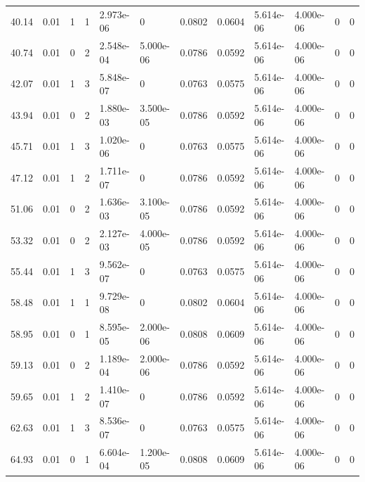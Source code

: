 \documentclass[preview]{standalone}
\begin{document}
{{\begin{tabular}{L{1.2cm}C{1.2cm} C{0.3cm}C{0.5cm} C{1.4cm}C{1.4cm} C{1.4cm}C{1.4cm} C{1.6cm}C{1.6cm} C{1.6cm}C{1.6cm}}
  40.14  &  0.01  & 1     &  1 &  2.973e-06  & 0  &  0.0802&   0.0604& 5.614e-06 & 4.000e-06   &  0 & 0  \\ 
  40.74  &  0.01  & 0     &  2 &  2.548e-04  & 5.000e-06  &  0.0786&   0.0592& 5.614e-06 & 4.000e-06   &  0 & 0  \\ 
  42.07  &  0.01  & 1     &  3 &  5.848e-07  & 0  &  0.0763&   0.0575& 5.614e-06 & 4.000e-06   &  0 & 0  \\ 
  43.94  &  0.01  & 0     &  2 &  1.880e-03  & 3.500e-05  &  0.0786&   0.0592& 5.614e-06 & 4.000e-06   &  0 & 0  \\ 
  45.71  &  0.01  & 1     &  3 &  1.020e-06  & 0  &  0.0763&   0.0575& 5.614e-06 & 4.000e-06   &  0 & 0  \\ 
  47.12  &  0.01  & 1     &  2 &  1.711e-07  & 0  &  0.0786&   0.0592& 5.614e-06 & 4.000e-06   &  0 & 0  \\ 
  51.06  &  0.01  & 0     &  2 &  1.636e-03  & 3.100e-05  &  0.0786&   0.0592& 5.614e-06 & 4.000e-06   &  0 & 0  \\ 
  53.32  &  0.01  & 0     &  2 &  2.127e-03  & 4.000e-05  &  0.0786&   0.0592& 5.614e-06 & 4.000e-06   &  0 & 0  \\ 
  55.44  &  0.01  & 1     &  3 &  9.562e-07  & 0  &  0.0763&   0.0575& 5.614e-06 & 4.000e-06   &  0 & 0  \\ 
  58.48  &  0.01  & 1     &  1 &  9.729e-08  & 0  &  0.0802&   0.0604& 5.614e-06 & 4.000e-06   &  0 & 0  \\ 
  58.95  &  0.01  & 0     &  1 &  8.595e-05  & 2.000e-06  &  0.0808&   0.0609& 5.614e-06 & 4.000e-06   &  0 & 0  \\ 
  59.13  &  0.01  & 0     &  2 &  1.189e-04  & 2.000e-06  &  0.0786&   0.0592& 5.614e-06 & 4.000e-06   &  0 & 0  \\ 
  59.65  &  0.01  & 1     &  2 &  1.410e-07  & 0  &  0.0786&   0.0592& 5.614e-06 & 4.000e-06   &  0 & 0  \\ 
  62.63  &  0.01  & 1     &  3 &  8.536e-07  & 0  &  0.0763&   0.0575& 5.614e-06 & 4.000e-06   &  0 & 0  \\ 
  64.93  &  0.01  & 0     &  1 &  6.604e-04  & 1.200e-05  &  0.0808&   0.0609& 5.614e-06 & 4.000e-06   &  0 & 0  \\ 
\hline 
\end{tabular} 

}}
\end{document}
